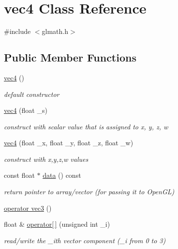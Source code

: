 \hypertarget{classvec4}{}\section{vec4 Class Reference}
\label{classvec4}


{\ttfamily \#include $<$glmath.\+h$>$}

\subsection*{Public Member Functions}
\begin{DoxyCompactItemize}
\item 
\hyperlink{classvec4_aa29685cf2528dae6ad7d74a7e01c1d6f}{vec4} ()
\begin{DoxyCompactList}\small\item\em default constructor \end{DoxyCompactList}\item 
\hyperlink{classvec4_ae1b8361552262b9f52f0e164086b52fa}{vec4} (float \+\_\+s)
\begin{DoxyCompactList}\small\item\em construct with scalar value that is assigned to x, y, z, w \end{DoxyCompactList}\item 
\hyperlink{classvec4_aefebfcef5cfacc8d070c28f4c84709f2}{vec4} (float \+\_\+x, float \+\_\+y, float \+\_\+z, float \+\_\+w)
\begin{DoxyCompactList}\small\item\em construct with x,y,z,w values \end{DoxyCompactList}\item 
const float $\ast$ \hyperlink{classvec4_a5fd305cabd88de4f64e9fb6bab95df89}{data} () const 
\begin{DoxyCompactList}\small\item\em return pointer to array/vector (for passing it to Open\+GL) \end{DoxyCompactList}\item 
\hyperlink{classvec4_aa833810e2ec237c4a1668b982b902d86}{operator vec3} ()
\item 
float \& \hyperlink{classvec4_aec6937954e939236b02eda65b00abf5d}{operator\mbox{[}$\,$\mbox{]}} (unsigned int \+\_\+i)
\begin{DoxyCompactList}\small\item\em read/write the \+\_\+i\textquotesingle{}th vector component (\+\_\+i from 0 to 3) \end{DoxyCompactList}\item 

\end{DoxyCompactItemize}
